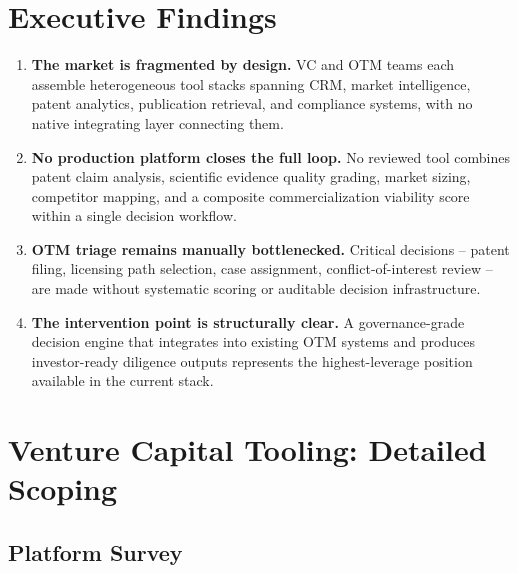\documentclass[11pt]{article}
\begin{document}
\section{Executive Findings}

\begin{insightbox}
\begin{enumerate}[leftmargin=1.4em, itemsep=5pt]
  \item[\textbf{1.}] \textbf{The market is fragmented by design.}
        VC and OTM teams each assemble heterogeneous tool stacks spanning CRM,
        market intelligence, patent analytics, publication retrieval, and
        compliance systems, with no native integrating layer connecting them.

  \item[\textbf{2.}] \textbf{No production platform closes the full loop.}
        No reviewed tool combines patent claim analysis, scientific evidence
        quality grading, market sizing, competitor mapping, and a composite
        commercialization viability score within a single decision workflow.

  \item[\textbf{3.}] \textbf{OTM triage remains manually bottlenecked.}
        Critical decisions -- patent filing, licensing path selection, case
        assignment, conflict-of-interest review -- are made without systematic
        scoring or auditable decision infrastructure.

  \item[\textbf{4.}] \textbf{The intervention point is structurally clear.}
        A governance-grade decision engine that integrates into existing OTM
        systems and produces investor-ready diligence outputs represents the
        highest-leverage position available in the current stack.
\end{enumerate}
\end{insightbox}

\section{Venture Capital Tooling: Detailed Scoping}

\subsection{Platform Survey}
\end{document}
